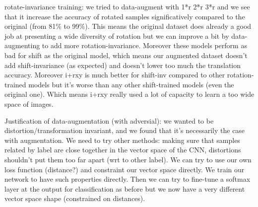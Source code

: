 \documentclass[a4paper,12pt]{article}
\begin{document}
rotate-invariance training: we tried to data-augment with 1*r 2*r 3*r and we see that it increase the accuracy of rotated samples significatively compared to the original (from 81\% to 99\%). This means the original dataset does already a good job at presenting a wide diversity of rotation but we can improve a bit by data-augmenting to add more rotation-invariance.
Moreover these models perform as bad for shift as the original model, which means our augmented dataset doesn't add shift-invariance (as expected) and doesn't lower too much the translation accuracy.
Moreover i+rxy is much better for shift-inv compared to other rotation-trained models but it's worse than any other shift-trained models (even the original one). Which means i+rxy really used a lot of capacity to learn a too wide space of images.

Justification of data-augmentation (with adversial): we wanted to be distortion/transformation invariant, and we found that it's necessarily the case with augmentation. We need to try other methods: making sure that samples related by label are close together in the vector space of the CNN, distortions shouldn't put them too far apart (wrt to other label). We can try to use our own loss function (distance?) and constraint our vector space directly.
We train our network to have such properties directly. Then we can try to fine-tune a softmax layer at the output for classification as before but we now have a very different vector space shape (constrained on distances).
\end{document}
